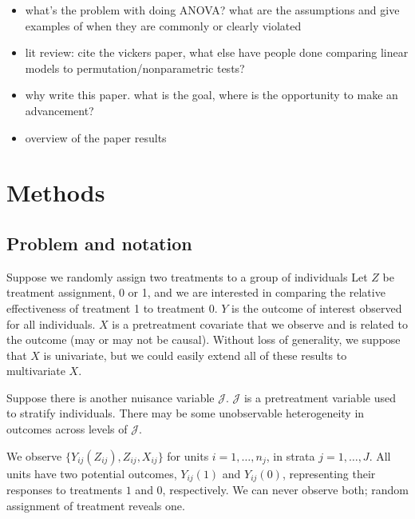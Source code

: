 \documentclass[11pt]{article}
\newcommand{\bit}{\begin{itemize}}
\newcommand{\eit}{\end{itemize}}
\begin{document}
\bit
\item what's the problem with doing ANOVA? what are the assumptions and give examples of when they are commonly or clearly violated
\item lit review: cite the vickers paper, what else have people done comparing linear models to permutation/nonparametric tests?
\item why write this paper. what is the goal, where is the opportunity to make an advancement?
\item overview of the paper results
\eit


\section{Methods}


\subsection{Problem and notation}
Suppose we randomly assign two treatments to a group of individuals
Let $Z$ be treatment assignment, 0 or 1, and we are interested in comparing the relative effectiveness of treatment 1 to treatment 0.
$Y$ is the outcome of interest observed for all individuals.
$X$ is a pretreatment covariate that we observe and is related to the outcome (may or may not be causal).  
Without loss of generality, we suppose that $X$ is univariate, but we could easily extend all of these results to multivariate $X$.

Suppose there is another nuisance variable $\mathcal{J}$. 
$\mathcal{J}$ is a pretreatment variable used to stratify individuals. 
There may be some unobservable heterogeneity in outcomes across levels of $\mathcal{J}$.

We observe $\{Y_{ij}(Z_{ij}), Z_{ij}, X_{ij}\}$ for units $i = 1, \dots, n_j$, in strata $j = 1, \dots, J$.
All units have two potential outcomes, $Y_{ij}(1)$ and $Y_{ij}(0)$, representing their responses to treatments $1$ and $0$, respectively.
We can never observe both; random assignment of treatment reveals one.
\end{document}

